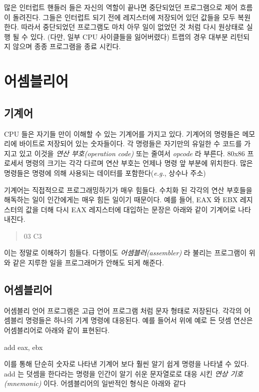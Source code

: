많은 인터럽트 핸들러 들은 자신의 역할이 끝나면 중단되었던 프로그램으로 제어 흐름이 돌려진다. 그들은 인터럽트 되기 전에 레지스터에 저장되어 있던
값들을 모두 복원한다. 따라서 중단되었던 프로그램도 마치 아무 일이 없었던 것 처럼 다시 원상태로 실행 될 수 있다.
(다만, 일부 CPU 사이클들을 잃어버렸다) 트랩의 경우 대부분 리턴되지 않으며 종종 프로그램을 종료 시킨다. 

\section{어셈블리어}

\subsection{기계어}
CPU 들은 자기들 만이 이해할 수 있는 기계어를 가지고 있다. 기계어의 명령들은 메모리에 바이트로 저장되어 있는 숫자들이다. 각 명령들은 자기만의 
유일한 수 코드를 가지고 있고 이것을 \emph{연산 부호(operation code)} 또는 줄여서 \emph{opcode} 라 부른다. 80x86 프로세서 명령의 크기는 
각각 다르며 연산 부호는 언제나 명령 앞 부분에 위치한다. 많은 명령들은 명령에 의해 사용되는 데이터를 포함한다({\em e.g.\/}, 상수나 주소)

기계어는 직접적으로 프로그래밍하기가 매우 힘들다. 수치화 된 각각의 연산 부호들을 해독하는 일이 인간에게는 매우 힘든 일이기 때문이다. 예를 들어, 
EAX 와 EBX 레지스터의 값을 더해 다시 EAX 레지스터에 대입하는 문장은 아래와 같이 기계어로 나타내진다.  

\begin{quote}
   03 C3
\end{quote}
이는 정말로 이해하기 힘들다. 다행이도 \emph{어셈블러(assembler)}  라 불리는 프로그램이 위와 같은 지루한 일을 프로그래머가 안해도 되게
해준다. 

\subsection{어셈블리어}
어셈블리 언어 프로그램은 고급 언어 프로그램 처럼 문자 형태로 저장된다. 각각의 어셈블리 명령들은 하나의 기계 명령에 대응된다. 예를 들어서 위에
예로 든 덧셈 연산은 어셈블리어로 아래와 같이 표현된다.

\begin{CodeQuote}
   add eax, ebx
\end{CodeQuote}
이를 통해 단순히 숫자로 나타낸 기계어 보다 훨씬 알기 쉽게 명령을 나타낼 수 있다.
{\code add} 는 덧셈을 한다라는 명령을 인간이 알기 쉬운 문자열로로 대응 시킨
\emph{연상 기호(mnemonic)}  이다. 어셈블리어의 일반적인 형식은 아래와 같다

